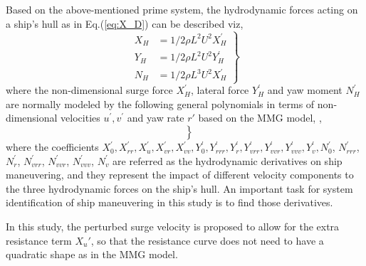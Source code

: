 \noindent Based on the above-mentioned prime system, the hydrodynamic forces acting on a ship's hull as in Eq.(\ref{eq:X_D}) can be described viz,
\begin{equation}
    \label{eq:XYN_H}
    \left.\begin{aligned}
    X_H & = 1/2\rho L^{2} U^{2} X_H^{'}  \\
    Y_H & = 1/2\rho L^{2} U^{2} Y_H^{'}  \\
    N_H & = 1/2\rho L^{3} U^{2} X_H^{'}
    \end{aligned}\right\}
\end{equation}
where the non-dimensional surge force $X_H^{'}$, lateral force $Y_H^{'}$ and yaw moment $N_H^{'}$ are normally modeled by the following general polynomials in terms of non-dimensional velocities $u^{'}, v^{'}$ and yaw rate $r'$ based on the MMG model, \citep{yasukawaIntroductionMMGStandard2015},
\begin{equation}
    \label{eq:XYN_H_prime}
    \left.\begin{aligned}
     \\
     \\
    
    \end{aligned}\right\}
\end{equation}
where the coefficients $X_0^{'}, X_{rr}^{'}, X_u^{'}, X_{vr}^{'}, X_{vv}^{'}, Y_{0}^{'}, Y_{rrr}^{'}, Y_{r}^{'}, Y_{vrr}^{'}, Y_{vvr}^{'}, Y_{vvv}^{'}, Y_{v}^{'}, N_{0}^{'}$, $N_{rrr}^{'}$, $N_{r}^{'}$, $N_{vrr}^{'}$, $N_{vvr}^{'}$, $N_{vvv}^{'}$, $N_{v}^{'}$ are referred as the hydrodynamic derivatives on ship maneuvering, and they represent the impact of different velocity components to the three hydrodynamic forces on the ship's hull. An important task for system identification of ship maneuvering in this study is to find those derivatives.

In this study, the perturbed surge velocity is proposed to allow for the extra resistance term ${X_u}'$, so that the resistance curve does not need to have a quadratic shape as in the MMG model.  
%
%     
%     
